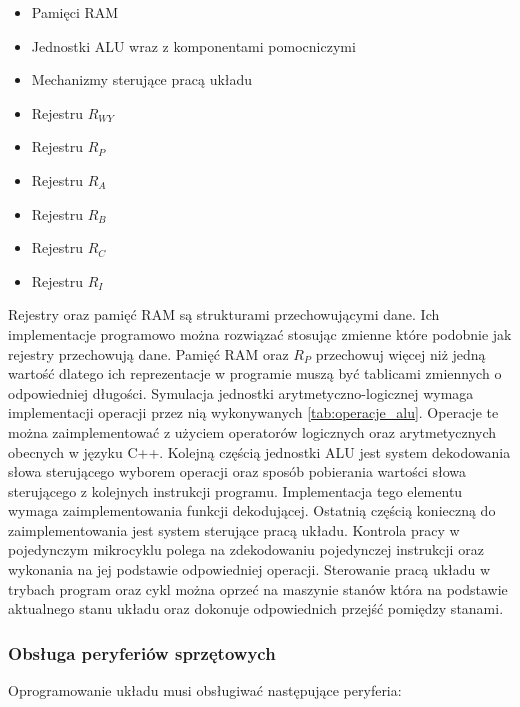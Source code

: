 \documentclass[../main.tex]{subfiles}
\begin{document}
    \begin{itemize}
        \item Pamięci RAM
        \item Jednostki ALU wraz z komponentami pomocniczymi
        \item Mechanizmy sterujące pracą układu
        \item Rejestru $R_{WY}$
        \item Rejestru $R_P$
        \item Rejestru $R_A$
        \item Rejestru $R_B$
        \item Rejestru $R_C$
        \item Rejestru $R_I$
    \end{itemize}

    Rejestry oraz pamięć RAM są strukturami przechowującymi dane. Ich implementacje programowo można rozwiązać stosując zmienne które
    podobnie jak rejestry przechowują dane. Pamięć RAM oraz $R_P$ przechowuj więcej niż jedną wartość dlatego ich reprezentacje w 
    programie muszą być tablicami zmiennych o odpowiedniej długości. Symulacja jednostki arytmetyczno-logicznej wymaga implementacji
    operacji przez nią wykonywanych \ref{tab:operacje_alu}. Operacje te można zaimplementować z użyciem operatorów logicznych oraz arytmetycznych
    obecnych w języku C++. Kolejną częścią jednostki ALU jest system dekodowania słowa sterującego wyborem operacji oraz sposób pobierania
    wartości słowa sterującego z kolejnych instrukcji programu. Implementacja tego elementu wymaga zaimplementowania funkcji dekodującej.
    Ostatnią częścią konieczną do zaimplementowania jest system sterujące pracą układu. Kontrola pracy w pojedynczym mikrocyklu polega
    na zdekodowaniu pojedynczej instrukcji oraz wykonania na jej podstawie odpowiedniej operacji. Sterowanie pracą układu w trybach program
    oraz cykl można oprzeć na maszynie stanów która na podstawie aktualnego stanu układu oraz dokonuje odpowiednich przejść pomiędzy stanami.

    \subsubsection{Obsługa peryferiów sprzętowych}

    Oprogramowanie układu musi obsługiwać następujące peryferia:
\end{document}
